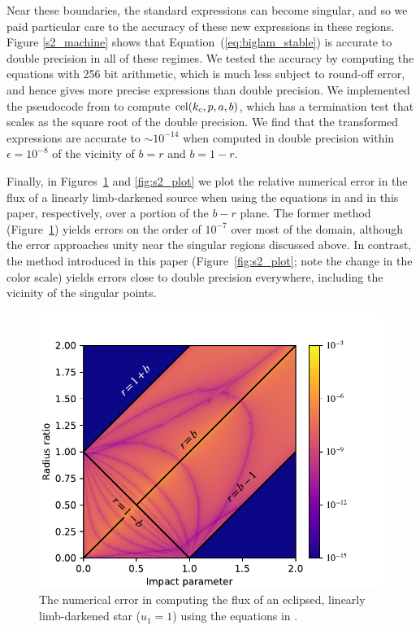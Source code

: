 \documentclass[modern,trackchanges]{aastex63}
\newcommand{\edited}{}
\begin{document}
Near these boundaries, the standard \citet{MandelAgol2002} expressions
can become singular, and so we paid particular care to the accuracy of these
new expressions in these regions.  Figure \ref{s2_machine} shows
that Equation~(\ref{eq:biglam_stable}) is accurate to double
precision in all of these regimes.
We tested the accuracy by computing the equations with 256 bit
arithmetic, which is much less subject to round-off error, and
hence gives more precise expressions than double precision.  We implemented the
pseudocode from \citet{Bulirsch1969} to compute ${\rm cel}(k_c,p,a,b)$,
which has a termination test that scales as the square root of
the {\edited double} precision.  We find that the transformed expressions
are accurate to $\sim 10^{-14}$ when computed in double precision
within $\epsilon = 10^{-8}$ of the vicinity of $b=r$ and $b=1-r$.

Finally, in Figures~\ref{fig:s2_plot_MA2002} and \ref{fig:s2_plot} we plot
the relative numerical error in the flux of a linearly limb-darkened source
when using the equations in \citet{MandelAgol2002} and in this paper,
respectively, over a portion of the $b-r$ plane. The former method
(Figure~\ref{fig:s2_plot_MA2002}) yields errors
on the order of $10^{-7}$ over most of the domain, although the error approaches
unity near the singular regions discussed above. In contrast, the method introduced
in this paper (Figure~\ref{fig:s2_plot}; note the change in the color scale)
yields errors close to {\edited double} precision everywhere, including the vicinity of the
singular points.

\begin{figure}[p!]
    \begin{centering}
    \includegraphics[width=0.8\linewidth]{figures/julia/s2_residuals_MA2002.pdf}
    \caption{The numerical error in computing the flux of an eclipsed, linearly
             limb-darkened star ($u_1=1$) using the equations in \citet{MandelAgol2002}.
             \label{fig:s2_plot_MA2002}}
    \end{centering}
\end{figure}
\end{document}
